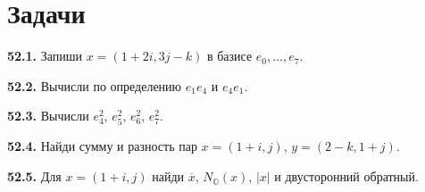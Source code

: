 \section*{Задачи}
\begingroup\setlength{\parskip}{2pt}
\noindent\begin{minipage}[t]{\linewidth}\textbf{52.1.} Запиши \(x=(1+2i,3j-k)\) в базисе \(e_0,\ldots,e_7\).\par\end{minipage}\par
\noindent\begin{minipage}[t]{\linewidth}\textbf{52.2.} Вычисли по определению \(e_1e_4\) и \(e_4e_1\).\par\end{minipage}\par
\noindent\begin{minipage}[t]{\linewidth}\textbf{52.3.} Вычисли \(e_4^2\), \(e_5^2\), \(e_6^2\), \(e_7^2\).\par\end{minipage}\par
\noindent\begin{minipage}[t]{\linewidth}\textbf{52.4.} Найди сумму и разность пар \(x=(1+i,j)\), \(y=(2-k,1+j)\).\par\end{minipage}\par
\noindent\begin{minipage}[t]{\linewidth}\textbf{52.5.} Для \(x=(1+i,j)\) найди \(\overline x\), \(N_{\mathbb O}(x)\), \(|x|\) и двусторонний обратный.\par\end{minipage}\par
